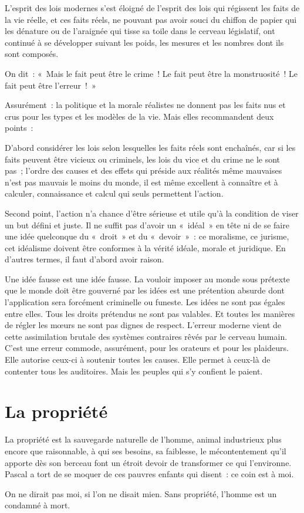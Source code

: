 \documentclass[french,twoside]{book} %
\begin{document}
\noindent L’esprit des lois modernes s’est éloigné de l’esprit des lois qui régissent les faits de la vie réelle, et ces faits réels, ne pouvant pas avoir souci du chiffon de papier qui les dénature ou de l’araignée qui tisse sa toile dans le cerveau législatif, ont continué à se développer suivant les poids, les mesures et les nombres dont ils sont composés.\par
On dit : « Mais le fait peut être le crime ! Le fait peut être la monstruosité ! Le fait peut être l’erreur ! »\par
Assurément : la politique et la morale réalistes ne donnent pas les faits nus et crus pour les types et les modèles de la vie. Mais elles recommandent deux points :\par
D’abord considérer les lois selon lesquelles les faits réels sont enchaînés, car si les faits peuvent être vicieux ou criminels, les lois du vice et du crime ne le sont pas ; l’ordre des causes et des effets qui préside aux réalités même mauvaises n’est pas mauvais le moins du monde, il est même excellent à connaître et à calculer, connaissance et calcul qui seuls permettent l’action.\par
Second point, l’action n’a chance d’être sérieuse et utile qu’à la condition de viser un but défini et juste. Il ne suffit pas d’avoir un « idéal » en tête ni de se faire une idée quelconque du « droit » et du « devoir » : ce moralisme, ce jurisme, cet idéalisme doivent être conformes à la vérité idéale, morale et juridique. En d’autres termes, il faut d’abord avoir raison.\par
Une idée fausse est une idée fausse. La vouloir imposer au monde sous prétexte que le monde doit être gouverné par les idées est une prétention absurde dont l’application sera forcément criminelle ou funeste. Les idées ne sont pas égales entre elles. Tous les droits prétendus ne sont pas valables. Et toutes les manières de régler les mœurs ne sont pas dignes de respect. L’erreur moderne vient de cette assimilation brutale des systèmes contraires rêvés par le cerveau humain. C’est une erreur commode, assurément, pour les orateurs et pour les plaideurs. Elle autorise ceux-ci à soutenir toutes les causes. Elle permet à ceux-là de contenter tous les auditoires. Mais les peuples qui s’y confient le paient.
\section[{La propriété}]{La propriété}
\noindent La propriété est la sauvegarde naturelle de l’homme, animal industrieux plus encore que raisonnable, à qui ses besoins, sa faiblesse, le mécontentement qu’il apporte dès son berceau font un étroit devoir de transformer ce qui l’environne. Pascal a tort de se moquer de ces pauvres enfants qui disent : ce coin est à moi.\par
On ne dirait pas moi, si l’on ne disait mien. Sans propriété, l’homme est un condamné à mort.\par
\end{document}
